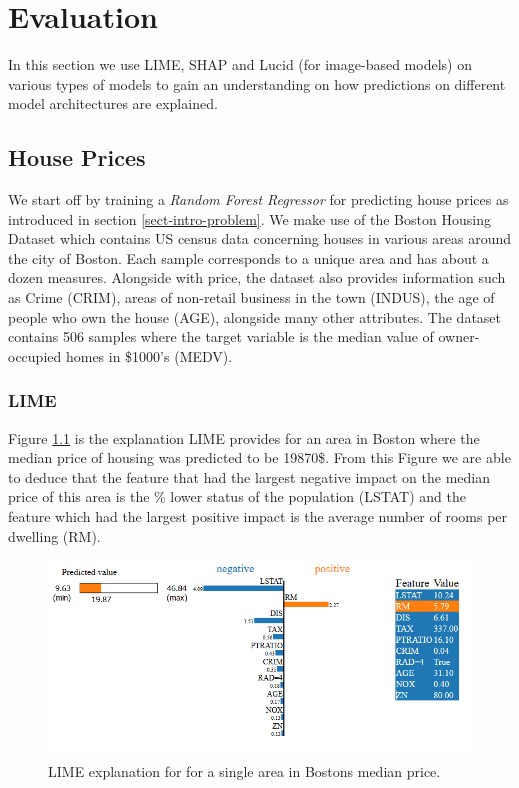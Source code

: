 

\chapter{Evaluation}
In this section we use LIME, SHAP and Lucid (for image-based models) on various types of models to gain an understanding on how predictions on different model architectures are explained.

\section{House Prices}
We start off by training a \emph{Random Forest Regressor} for predicting house prices as introduced in section \ref{sect-intro-problem}. We make use of the  Boston Housing Dataset which contains US census data concerning houses in various areas around the city of Boston. Each sample corresponds to a unique area and has about a dozen measures. Alongside with price, the dataset also provides information such as Crime (CRIM), areas of non-retail business in the town (INDUS), the age of people who own the house (AGE), alongside many other attributes.  The dataset contains 506 samples where the target variable is the median value of owner-occupied homes in \$1000's (MEDV).

\subsection{LIME}
Figure \ref{fig:lime-house} is the explanation LIME provides for an area in Boston where the median price of housing was predicted to be 19870\$. From this Figure we are able to deduce that the feature that had the largest negative impact on the median price of this area is the \% lower status of the population (LSTAT) and the feature which had the largest positive impact is the average number of rooms per dwelling (RM).
\begin  {figure}[!htpb]
  \includegraphics[width=\linewidth]{Evaluation_Images/House_LIME.png}
  \caption{LIME explanation for for a single area in Bostons median price.}
  \label{fig:lime-house}
\end{figure}

